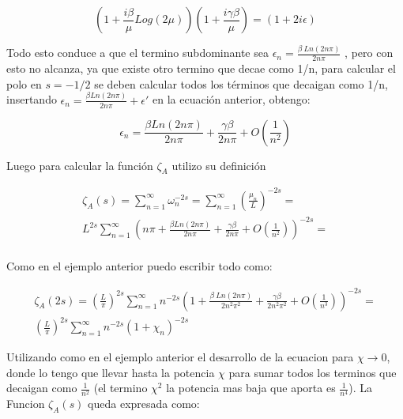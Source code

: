 \begin{equation}
(1 + \frac{i \beta}{ \mu} Log( 2 \mu) ) 
(1 + \frac{i  \gamma \beta}{ \mu})  =
(1 + 2 i \epsilon)
\end{equation}

Todo esto conduce a que el termino subdominante sea $\epsilon _n =  \frac{\beta \ Ln(2 n \pi)}{2 n \pi}$ , pero con esto no alcanza, ya que existe otro termino que decae como 1/n, para calcular el polo en $s=-1/2$ se deben calcular todos los términos que decaigan como 1/n, insertando $\epsilon _n =  \frac{\beta Ln(2 n \pi)}{2 n \pi} + \epsilon '$ en la ecuación anterior, obtengo:


\begin{equation}
    \epsilon _n =  \frac{\beta Ln(2 n \pi)}{2 n \pi} +
                \frac{\gamma \beta}{2 n \pi} +
                O(\frac{1}{n^2})
\end{equation}

Luego para calcular la función $\zeta _{A}$ utilizo su definición

\begin{equation}
\begin{array}{c}
    \zeta _A (s) = \sum _{n=1} ^{\infty} \omega _n ^{-2 s}  =
    \sum _{n=1} ^{\infty} \left(\frac{\mu _n}{L} \right) ^{-2 s} =  \\
    L ^{2 s} \sum _{n=1} ^{\infty} 
    \left( 
    n \pi + \frac{\beta Ln(2 n \pi)}{2 n \pi} + \frac{\gamma \beta}{2 n \pi} +
    O(\frac{1}{n^2})
    \right) ^{-2s} = \\
    
\end{array}
\end{equation}

Como en el ejemplo anterior puedo escribir todo como:

\begin{equation}
\begin{array}{c}
    \zeta _A (2 s) = \left( \frac{L}{\pi} \right)  ^{2 s} 
    \sum _{n=1} ^{\infty} n ^{- 2  s}
    \left(
    1 + \frac{\beta \ Ln(2 n \pi)}{2 n^2 \pi ^2} + \frac{\gamma \beta}{2 n^2 \pi ^2 } +
    O \left( \frac{1}{n^3} \right)  \right) ^{-2 s} = \\
    ( \frac{L}{\pi} ) ^{2 s}
    \sum _{n=1} ^{\infty} n ^{-2 s} 
    \left(
    1 + \chi _n \right) ^{- 2 s}
\end{array}
\end{equation}

Utilizando como en el ejemplo anterior el desarrollo de la ecuacion para $\chi \rightarrow 0$, donde lo tengo que llevar hasta la potencia $ \chi  $ para sumar todos los terminos que decaigan como $\frac{1}{n ^2}$ (el termino $\chi ^2 $ la potencia mas baja que aporta es $\frac{1}{n ^4}$). La Funcion $\zeta _A (s)$ queda expresada como:


